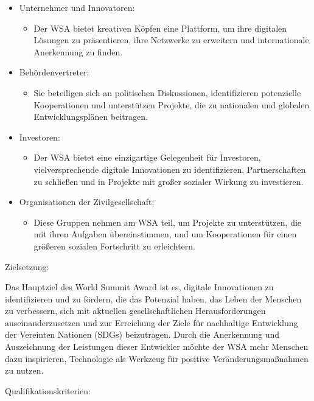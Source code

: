 \begin{itemize}
    \item {Unternehmer und Innovatoren:}
          \begin{itemize}
              \item {Der WSA bietet kreativen Köpfen eine Plattform, um ihre digitalen Lösungen zu präsentieren, ihre Netzwerke zu erweitern und internationale Anerkennung zu finden.}
          \end{itemize}
    \item {Behördenvertreter:}
          \begin{itemize}
              \item {Sie beteiligen sich an politischen Diskussionen, identifizieren potenzielle Kooperationen und unterstützen Projekte, die zu nationalen und globalen Entwicklungsplänen beitragen.}
          \end{itemize}
    \item {Investoren:}
          \begin{itemize}
              \item {Der WSA bietet eine einzigartige Gelegenheit für Investoren, vielversprechende digitale Innovationen zu identifizieren, Partnerschaften zu schließen und in Projekte mit großer sozialer Wirkung zu investieren.}
          \end{itemize}
    \item {Organisationen der Zivilgesellschaft:}
          \begin{itemize}
              \item {Diese Gruppen nehmen am WSA teil, um Projekte zu unterstützen, die mit ihren Aufgaben übereinstimmen, und um Kooperationen für einen größeren sozialen Fortschritt zu erleichtern.}
          \end{itemize}
\end{itemize}

Zielsetzung:

Das Hauptziel des World Summit Award ist es, digitale Innovationen zu identifizieren und zu fördern, die das Potenzial haben, das Leben der Menschen zu verbessern, sich mit aktuellen gesellschaftlichen Herausforderungen auseinanderzusetzen und zur Erreichung der Ziele für nachhaltige Entwicklung der Vereinten Nationen (SDGs) beizutragen. Durch die Anerkennung und Auszeichnung der Leistungen dieser Entwickler möchte der WSA mehr Menschen dazu inspirieren, Technologie als Werkzeug für positive Veränderungsmaßnahmen zu nutzen.

Qualifikationskriterien:

